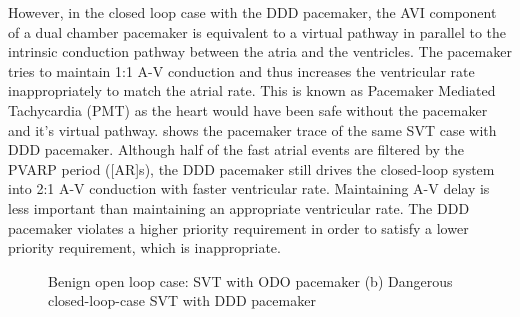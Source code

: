 However, in the closed loop case with the DDD pacemaker, the AVI component of a dual chamber pacemaker is equivalent to a virtual pathway in parallel to the intrinsic conduction pathway between the atria and the ventricles. The pacemaker tries to maintain 1:1 A-V conduction and thus increases the ventricular rate inappropriately to match the atrial rate.  This is known as Pacemaker Mediated Tachycardia (PMT) as the heart would have been safe without the pacemaker and it's virtual pathway.  shows the pacemaker trace of the same SVT case with DDD pacemaker. Although half of the fast atrial events are filtered by the PVARP period ([AR]s), the DDD pacemaker still drives the closed-loop system into 2:1 A-V conduction with faster ventricular rate. Maintaining A-V delay is less important than maintaining an appropriate ventricular rate. The DDD pacemaker violates a higher priority requirement in order to satisfy a lower priority requirement, which is inappropriate.
\begin{figure}[!t]
\centering
\vspace{-10pt}
		
\vspace{-10pt}
\caption{\small Benign open loop case: SVT with ODO pacemaker (b) Dangerous closed-loop-case SVT with DDD pacemaker}
\end{figure} 

